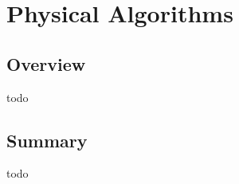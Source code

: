 


\chapter{Physical Algorithms}
\label{ch:physical}

\section{Overview}
todo


\newpage
\newpage
\newpage
\newpage
\newpage
\newpage

\section{Summary}
todo

